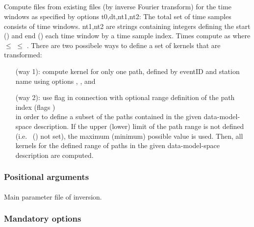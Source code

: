 \subsection{} \label{programs_scripts,sec:bin_prog,sec:spec_time_kernels}
Compute  files from existing  files (by inverse Fourier transform) 
for the time windows as specified by options t0,dt,nt1,nt2: The total set of time samples consists of 
 time windows. nt1,nt2 are strings containing  integers defining the start () 
and end () each time window by a time sample index. 
Times compute as  where  \(\le\)  \(\le\) .
There are two possibele ways to define a set of kernels that are transformed:
\begin{itemize}
\item[(way 1):] compute kernel for only one path, defined by eventID and station name using options , ,  and 
\item[(way 2):] use flag  in connection with optional range definition of the path index (flags  )\\
in order to define a subset of the paths contained in the given data-model-space description. If the upper (lower) limit of the path range is not defined 
(i.e.\  () not set), the maximum (minimum) possible value is used. Then, all kernels for the defined range of paths in the 
given data-model-space description are computed.
\end{itemize}
\subsubsection{Positional arguments}
\paragraph{}
Main parameter file of inversion.
\subsubsection{Mandatory options}
